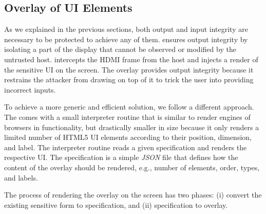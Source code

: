 \subsection{\device Overlay of UI Elements}
\label{sec:systemDesign:transformation}

As we explained in the previous sections, both output and input integrity are necessary to be protected to achieve any of them. \name ensures output integrity by isolating a part of the display that cannot be observed or modified by the untrusted host. \device intercepts the HDMI frame from the host and injects a render of the sensitive UI on the screen. The overlay provides output integrity because it restrains the attacker from drawing on top of it to trick the user into providing incorrect inputs. 


To achieve a more generic and efficient solution, we follow a different approach. The \device comes with a small interpreter routine that is similar to render engines of browsers in functionality, but drastically smaller in size because it only renders a limited number of HTML5 UI elements according to their position, dimension, and label. The interpreter routine reads a given specification and renders the respective UI. The specification is a simple \emph{JSON} file that defines how the content of the overlay should be rendered, e.g., number of elements, order, types, and labels.  

The process of rendering the overlay on the screen has two phases: (i) convert the existing sensitive form to specification, and (ii) specification to overlay.

